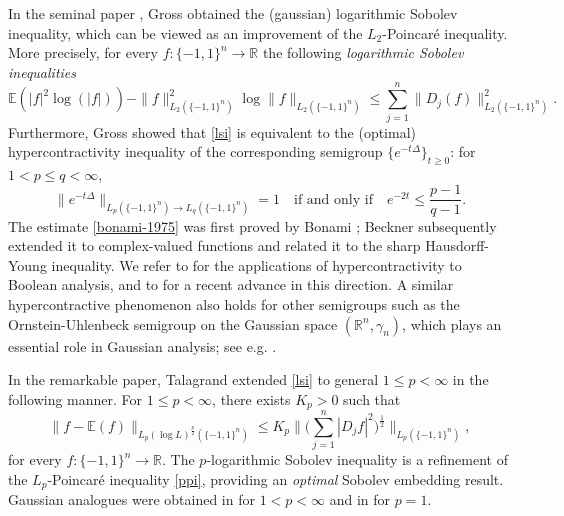 \documentclass{amsbook}
\theoremstyle{definition}
\theoremstyle{remark}
\numberwithin{section}{chapter}
\numberwithin{equation}{chapter}
\newcommand{\1}{\mathbf{1}}
\begin{document}
In the seminal paper \cite{Gr1975}, Gross obtained the (gaussian) logarithmic Sobolev inequality, which can be viewed as an improvement of the $L_2$-Poincar\'e inequality. More precisely, for every $f:\{-1,1\}^n\to\mathbb{R}$ the following \emph{logarithmic Sobolev inequalities} 
\begin{equation}\label{lsi}
\mathbb{E}\left(|f|^2\log(|f|)\right)-\|f\|_{L_{2}(\{-1,1\}^{n})}^2\log\|f\|_{L_{2}(\{-1,1\}^{n})}\leq\sum_{j=1}^{n}\|D_{j}(f)\|^{2}_{L_{2}(\{-1,1\}^{n})}.
\end{equation}
Furthermore, Gross showed that \eqref{lsi} is equivalent to the (optimal) hypercontractivity inequality of the corresponding semigroup $\{e^{-t\Delta}\}_{t\geq 0}$: for $1<p\leq q <\infty$, 
\begin{equation}\label{bonami-1975}
\|e^{-t\Delta }\|_{L_{p}(\{-1,1\}^{n})\to L_{q}(\{-1,1\}^{n})}=1 \quad \mbox{if and only if} \quad e^{-2t}\leq \frac{p-1}{q-1}.
\end{equation}
The estimate \eqref{bonami-1975} was first proved by Bonami \cite{Bo1970}; Beckner \cite{Bec1975} subsequently extended it to complex-valued functions and related it to the sharp Hausdorff-Young inequality. We refer to \cite{BKS1999,FKN2002} for the applications of hypercontractivity to Boolean analysis, and to \cite{IN2022} for a recent advance in this direction. A similar hypercontractive phenomenon
also holds for other semigroups such as the Ornstein-Uhlenbeck semigroup on the Gaussian space $(\mathbb{R}^{n},\gamma_{n})$, which plays an essential role in Gaussian analysis; see e.g. \cite{Gr1975}. 

In the remarkable paper, Talagrand \cite{Ta1993} extended \eqref{lsi} to general $1\leq p<\infty$ in the following manner. For $1\leq p<\infty$, there exists $K_{p}>0$ such that
 \begin{equation}\label{plsi}
\|f-\mathbb{E}(f)\|_{L_p(\log L)^{\frac{p}{2}}(\{-1,1\}^{n})}\leq K_p\Big\|\Big(\sum_{j=1}^{n}|D_jf|^2\Big)^{\frac{1}{2}}\Big\|_{L_p(\{-1,1\}^{n})},
\end{equation}
for every $f:\{-1,1\}^{n}\to \mathbb{R}$. The $p$-logarithmic Sobolev inequality is a refinement of the $L_{p}$-Poincar\'e inequality \eqref{ppi}, providing an \emph{optimal} Sobolev embedding result. Gaussian analogues were obtained in \cite{Ad1979,Fe1975} for $1<p<\infty$ and in \cite{Le1988} for $p=1$. 
\end{document}
